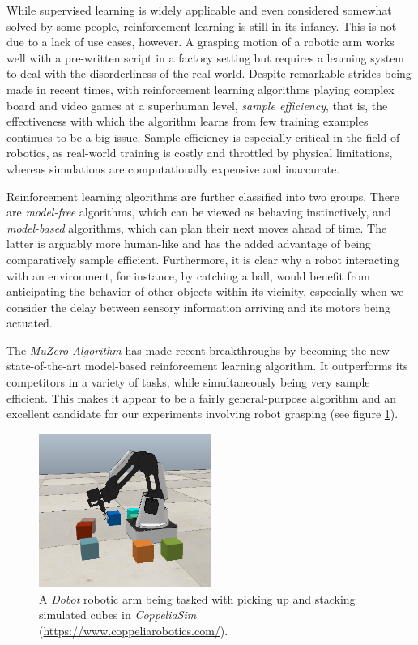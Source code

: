 While supervised learning is widely applicable and even considered somewhat solved by some people, reinforcement learning is still in its infancy. This is not due to a lack of use cases, however. A grasping motion of a robotic arm works well with a pre-written script in a factory setting but requires a learning system to deal with the disorderliness of the real world. Despite remarkable strides being made in recent times, with reinforcement learning algorithms playing complex board and video games at a superhuman level, \textit{sample efficiency}, that is, the effectiveness with which the algorithm learns from few training examples continues to be a big issue. Sample efficiency is especially critical in the field of robotics, as real-world training is costly and throttled by physical limitations, whereas simulations are computationally expensive and inaccurate.

Reinforcement learning algorithms are further classified into two groups. There are \textit{model-free} algorithms, which can be viewed as behaving instinctively, and \textit{model-based} algorithms, which can plan their next moves ahead of time. The latter is arguably more human-like and has the added advantage of being comparatively sample efficient. Furthermore, it is clear why a robot interacting with an environment, for instance, by catching a ball, would benefit from anticipating the behavior of other objects within its vicinity, especially when we consider the delay between sensory information arriving and its motors being actuated.

The \textit{MuZero Algorithm} \cite{muzero} has made recent breakthroughs by becoming the new state-of-the-art model-based reinforcement learning algorithm. It outperforms its competitors in a variety of tasks, while simultaneously being very sample efficient. This makes it appear to be a fairly general-purpose algorithm and an excellent candidate for our experiments involving robot grasping (see figure \ref{fig:cube_stacking}).
\begin{figure}[ht]
    \centering
    \includegraphics[width=0.5\textwidth]{assets/cube_stacking.png}
    \caption{A \textit{Dobot} robotic arm being tasked with picking up and stacking simulated cubes in \textit{CoppeliaSim} (\url{https://www.coppeliarobotics.com/}).}
    \label{fig:cube_stacking}
\end{figure}

